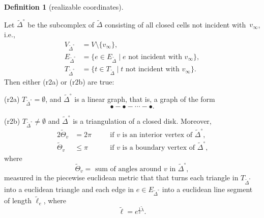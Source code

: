 \documentclass[a4paper, 11pt]{article}
\newcommand{\Deltil}{\widetilde{\Delta}}
\newcommand{\Deltilo}{\Deltil^{\circ}}
\newcommand{\lamtil}{\tilde{\lambda}}
\newcommand{\elltil}{\tilde{\ell}}
\newcommand{\Thetatil}{\widetilde{\Theta}}
\theoremstyle{plain}
\theoremstyle{definition}
\newtheorem{definition}[theorem]{Definition}
\begin{document}
\begin{definition}[realizable coordinates]
\begin{compactenum}[(r1)]
  \item Let $\Deltilo$ be the subcomplex of $\Deltil$ consisting of all
    closed cells not incident with~$v_{\infty}$, i.e.,
    \begin{align}
      V_{\Deltilo}&=V\setminus\{v_{\infty}\},\\
      \label{eq:Eo}
      E_{\Deltilo} &=\{e\in E_{\Deltil}\;|\; e \text{ not incident
                      with }v_{\infty}\},\\
      \label{eq:To}
      T_{\Deltilo} &=\{t\in T_{\Deltil}\;|\; t\text{ not incident
                      with }v_{\infty}\}.
    \end{align}
    Then either (r2a) or (r2b) are true:
    \begin{compactitem}[(r2a)]
    \item[(r2a)] $T_{\Deltilo}=\emptyset$, and $\Deltilo$ is a linear
      graph, that is, a graph of the form
      \begin{equation*}
        \bullet-\bullet-\cdots-\bullet.
      \end{equation*}
    \item[(r2b)] $T_{\Deltilo}\not=\emptyset$ and $\Deltilo$ is a
      triangulation of a closed disk. Moreover,
      \begin{alignat}{2}
        \label{eq:Thetatileq}
          \Thetatil_{v}&=2\pi\quad
          &&\text{if $v$ is an interior vertex of $\Deltilo$,}\\
        \label{eq:Thetatilineq}
          \Thetatil_{v}&\leq \pi\quad
          && \text{if $v$ is a boundary vertex of $\Deltilo$,}
      \end{alignat}
      where 
      \begin{equation}
        \label{eq:Thetatil}
        \Thetatil_{v}=\text{ sum of angles around $v$ in $\Deltilo{}$},
      \end{equation}
      measured in the piecewise euclidean metric that that
      turns each triangle in $T_{\Deltilo}$ into a euclidean triangle
      and each edge in $e\in E_{\Deltilo}$ into a euclidean line segment of
      length $\elltil_{e}$, where
      \begin{equation}
        \label{eq:elltil}
        \elltil=e^{\frac{1}{2}\lamtil}.
      \end{equation}
    \end{compactitem}
  \end{compactenum}    
\end{definition}
\end{document}
